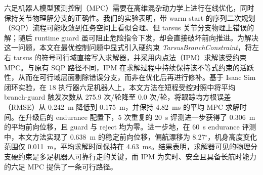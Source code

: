 六足机器人模型预测控制（MPC）需要在高维混杂动力学上进行在线优化，同时保持关节物理解分支的正确性。我们的实验表明，带 warm start 的序列二次规划（SQP）流程可能收敛到任务空间上看似合理、但 tarsus 关节分支物理上错误的解；随后 runtime guard 虽可阻止危险指令下发，却会直接破坏前向推进。为解决这一问题，本文在最优控制问题中显式引入硬约束 \emph{TarsusBranchConstraint}，将左右 tarsus 的符号可行域直接写入求解器，并采用内点法（IPM）求解该受约束 MPC。与原有 SQP 路径不同，IPM 在求解过程中持续保持该不等式约束的活跃性，从而在可行域层面剔除错误分支，而非在优化后再进行修补。基于 Isaac Sim 闭环实验，在 18 执行器六足机器人上，本文方法在短程受控对照中将平均 branch-guard 触发次数从 275.9 次/轮降至 0.0 次/轮，将跟踪均方根误差（RMSE）从 0.242~m 降低到 0.175~m，并保持 4.82~ms 的平均 MPC 求解时间。在升级后的 endurance 配置下，5 次重复的 20~s 评测进一步获得了 0.306~m 的平均前向位移，且 guard 与 reject 均为零。进一步地，在 60~s endurance 评测中，本文方法实现了 0.638~m 的稳定前向位移，偏航漂移为 8.27$^\circ$，机身高度变化范围仅 0.011~m，平均求解时间保持在 4.63~ms。结果表明，求解器可见的物理分支硬约束是多足机器人可靠行走的关键，而 IPM 为实时、安全且具备长航时能力的六足 MPC 提供了一条可行路径。
